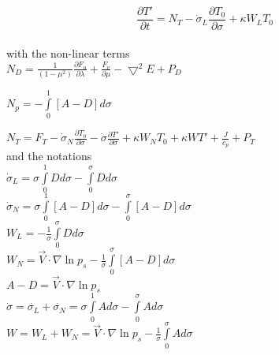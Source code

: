 \begin{equation}
{\displaystyle \frac{\partial T'}{\partial t} = N_T- 
\dot {\sigma}_L
  \frac{\partial T_0}{\partial \sigma} + \kappa W_L T_0 } \label{Mtemp}
\end{equation}\\




with the non-linear terms\\




${\displaystyle 
{\displaystyle N_D = \frac{1}{(1 - \mu^2)} \frac{\partial F_u}{\partial \lambda} + \frac{F_\nu}{\partial \mu} - \bigtriangledown^2 E  + P_D}
}$

${\displaystyle 
{\displaystyle N_p 
= - \int\limits_{0}^{1} [A-D] d \sigma}
}$

${\displaystyle 
{\displaystyle N_T = F_T 
- \dot{\sigma}_N \frac{\partial T_0}{\partial \sigma} 
- \dot{\sigma} \frac{\partial T'}{\partial \sigma} 
+ \kappa W_N T_0   + \kappa W T'   
+ \frac{J}{c_p} + P_{T}}
}$\\


and the notations\\

${\displaystyle
\dot {\sigma}_L =  \sigma \int\limits_{0}^{1} D d \sigma
-  \int\limits_{0}^{\sigma} D d \sigma  }$\\

${\displaystyle
\dot {\sigma}_N =  \sigma \int\limits_{0}^{1} [A-D] d \sigma
-  \int\limits_{0}^{\sigma}  [A-D] d \sigma  }$\\


${\displaystyle
W_L  =  - \frac{1}{\sigma} \int\limits_{0}^{\sigma} D d \sigma  }$\\

${\displaystyle
W_N  =
\vec{V} \cdot  \nabla \ln p_s - \frac{1}{\sigma}\int\limits_{0}^{\sigma} 
[A  - D] d\sigma  }$\\

$A-D=\vec{V} \cdot \nabla \ln p_s$ \\


${\displaystyle
\dot {\sigma}=\dot {\sigma_L} + \dot {\sigma_N}
=  \sigma \int\limits_{0}^{1} A d \sigma
-  \int\limits_{0}^{\sigma} A d \sigma  }$\\


${\displaystyle
W= W_L+W_N =
\vec{V} \cdot  \nabla \ln p_s - \frac{1}{\sigma}\int\limits_{0}^{\sigma} A d
\sigma  }$\\



